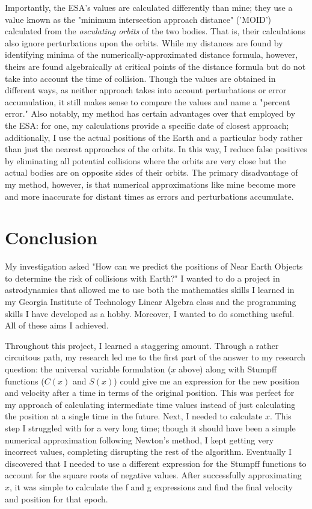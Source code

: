 \documentclass[12pt]{article}
\begin{document}
Importantly, the ESA's values are calculated differently than mine; they use a value known as the "minimum intersection approach distance" ('MOID') calculated from the \emph{osculating orbits} of the two bodies. That is, their calculations also ignore perturbations upon the orbits. While my distances are found by identifying minima of the numerically-approximated distance formula, however, theirs are found algebraically at critical points of the distance formula but do not take into account the time of collision. Though the values are obtained in different ways, as neither approach takes into account perturbations or error accumulation, it still makes sense to compare the values and name a "percent error." Also notably, my method has certain advantages over that employed by the ESA: for one, my calculations provide a specific date of closest approach; additionally, I use the actual positions of the Earth and a particular body rather than just the nearest approaches of the orbits. In this way, I reduce false positives by eliminating all potential collisions where the orbits are very close but the actual bodies are on opposite sides of their orbits. The primary disadvantage of my method, however, is that numerical approximations like mine become more and more inaccurate for distant times as errors and perturbations accumulate.

\section{Conclusion}
My investigation asked "How can we predict the positions of Near Earth Objects to determine the risk of collisions with Earth?" I wanted to do a project in astrodynamics that allowed me to use both the mathematics skills I learned in my Georgia Institute of Technology Linear Algebra class and the programming skills I have developed as a hobby. Moreover, I wanted to do something useful. All of these aims I achieved.

Throughout this project, I learned a staggering amount. Through a rather circuitous path, my research led me to the first part of the answer to my research question: the universal variable formulation ($x$ above) along with Stumpff functions ($C(x)$ and $S(x)$) could give me an expression for the new position and velocity after a time in terms of the original position. This was perfect for my approach of calculating intermediate time values instead of just calculating the position at a single time in the future. Next, I needed to calculate $x$. This step I struggled with for a very long time; though it should have been a simple numerical approximation following Newton's method, I kept getting very incorrect values, completing disrupting the rest of the algorithm. Eventually I discovered that I needed to use a different expression for the Stumpff functions to account for the square roots of negative values. After successfully approximating $x$, it was simple to calculate the f and g expressions and find the final velocity and position for that epoch.
\end{document}
